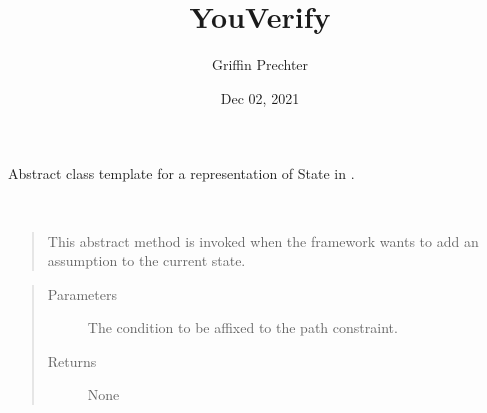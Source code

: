 \documentclass[letterpaper,10pt,english]{sphinxmanual}
\title{YouVerify}
\date{Dec 02, 2021}
\author{Griffin Prechter}
\begin{document}
\pagestyle{empty}
\sphinxmaketitle
\pagestyle{plain}
\sphinxtableofcontents
\pagestyle{normal}
\label{\detokenize{index::doc}}


\begin{fulllineitems}
\label{\detokenize{index:State.State}}
\sphinxAtStartPar
Abstract class template for a representation of State in .

\begin{fulllineitems}
\label{\detokenize{index:State.State.add_path_constraint}}~\begin{quote}

\sphinxAtStartPar
This abstract method is invoked when the framework wants to add an assumption to the current state.
\end{quote}
\begin{quote}\begin{description}
\item[{Parameters}] \leavevmode
\sphinxAtStartPar
{} \textendash{} The condition to be affixed to the path constraint.

\item[{Returns}] \leavevmode
\sphinxAtStartPar
None

\end{description}\end{quote}

\end{fulllineitems}


\begin{fulllineitems}
\label{\detokenize{index:State.State.advance_pc}}~\begin{quote}


\end{quote}
\end{fulllineitems}
\end{fulllineitems}
\end{document}
